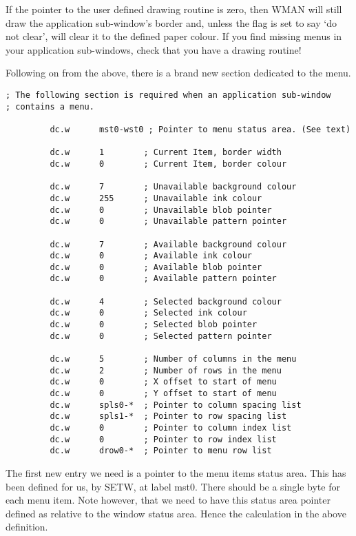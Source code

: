 \begin{note}
If the pointer to the user defined drawing routine is zero, then
 WMAN will still draw the application
      sub-{}window's border and, unless the flag is set to say `do not clear',
      will clear it to the defined paper colour. If you find missing menus in
      your application sub-{}windows, check that you have a drawing
      routine!
\end{note}

Following on from the above, there is a brand new section dedicated
    to the menu.

\begin{lstlisting}[firstnumber=23,caption={AppMenuTest1Win\_asm - Application Window Menu Area Definition}]
; The following section is required when an application sub-window
; contains a menu.

         dc.w      mst0-wst0 ; Pointer to menu status area. (See text)

         dc.w      1        ; Current Item, border width
         dc.w      0        ; Current Item, border colour

         dc.w      7        ; Unavailable background colour
         dc.w      255      ; Unavailable ink colour
         dc.w      0        ; Unavailable blob pointer
         dc.w      0        ; Unavailable pattern pointer

         dc.w      7        ; Available background colour
         dc.w      0        ; Available ink colour
         dc.w      0        ; Available blob pointer
         dc.w      0        ; Available pattern pointer

         dc.w      4        ; Selected background colour
         dc.w      0        ; Selected ink colour
         dc.w      0        ; Selected blob pointer
         dc.w      0        ; Selected pattern pointer

         dc.w      5        ; Number of columns in the menu
         dc.w      2        ; Number of rows in the menu
         dc.w      0        ; X offset to start of menu
         dc.w      0        ; Y offset to start of menu
         dc.w      spls0-*  ; Pointer to column spacing list
         dc.w      spls1-*  ; Pointer to row spacing list
         dc.w      0        ; Pointer to column index list
         dc.w      0        ; Pointer to row index list
         dc.w      drow0-*  ; Pointer to menu row list
\end{lstlisting}

The first new entry we need is a pointer to the menu items status
    area. This has been defined for us, by SETW, at
    label mst0. There should be a single byte for each menu item. Note
    however, that we need to have this status area pointer defined as relative
    to the window status area. Hence the calculation in the above
    definition.

